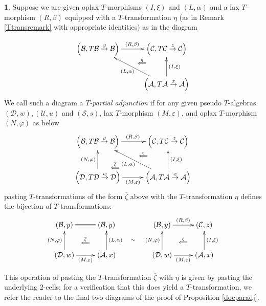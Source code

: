 \documentclass[a4paper,oneside,english]{amsart}
\numberwithin{equation}{section}
\numberwithin{figure}{section}
\theoremstyle{plain}
\theoremstyle{definition}
\newtheorem{defn}[thm]{\protect\definitionname}
\theoremstyle{remark}
\theoremstyle{definition}
\theoremstyle{plain}
\theoremstyle{plain}
\theoremstyle{plain}
\providecommand{\definitionname}{Definition}
\begin{document}
\begin{defn}
Suppose we are given oplax $T$-morphisms $\left(I,\xi\right)$ and
$\left(L,\alpha\right)$ and a lax $T$-morphism $\left(R,\beta\right)$
equipped with a $T$-transformation $\eta$ (as in Remark \ref{Ttransremark}
with appropriate identities) as in the diagram

\[
\xymatrix@=1em{\left(\mathcal{B},T\mathcal{B}\overset{y}{\rightarrow}\mathcal{B}\right)\ar[rr]^{\left(R,\beta\right)} &  & \left(\mathcal{C},T\mathcal{C}\overset{z}{\rightarrow}\mathcal{C}\right)\ar@{}[ld]|-{\stackrel{\eta}{\Longleftarrow}}\\
 & \;\\
 &  & \left(\mathcal{A},T\mathcal{A}\overset{x}{\rightarrow}\mathcal{A}\right)\ar[uu]_{\left(I,\xi\right)}\ar[uull]^{\left(L,\alpha\right)}
}
\]
We call such a diagram a \emph{$T$-partial adjunction }if for any
given pseudo $T$-algebras $\left(\mathcal{D},w\right),\left(\mathcal{U},u\right)$
and $\left(\mathcal{S},s\right)$, lax $T$-morphism $\left(M,{\varepsilon}\right)$,
and oplax $T$-morphism $\left(N,\varphi\right)$ as below
\[
\xymatrix@=1em{\left(\mathcal{B},T\mathcal{B}\overset{y}{\rightarrow}\mathcal{B}\right)\ar[rr]^{\left(R,\beta\right)} &  & \left(\mathcal{C},T\mathcal{C}\overset{z}{\rightarrow}\mathcal{C}\right)\ar@{}[ld]|-{\stackrel{\eta}{\Longleftarrow}}\\
 & \;\ar@{}[ld]|-{\stackrel{\overline{\zeta}}{\Longleftarrow}\quad\quad}\\
\left(\mathcal{D},T\mathcal{D}\overset{w}{\rightarrow}\mathcal{D}\right)\ar[rr]_{\left(M,{\varepsilon}\right)}\ar[uu]^{\left(N,\varphi\right)} &  & \left(\mathcal{A},T\mathcal{A}\overset{x}{\rightarrow}\mathcal{A}\right)\ar[uu]_{\left(I,\xi\right)}\ar[ulul]^{\left(L,\alpha\right)}
}
\]
pasting $T$-transformations of the form $\overline{\zeta}$ above
with the $T$-transformation $\eta$ defines the bijection of $T$-transformations:
\[
\xymatrix@=1em{\left(\mathcal{B},y\right)\ar@{=}[rr] &  & \left(\mathcal{B},y\right)\ar@{}[ldld]|-{\stackrel{\overline{\zeta}}{\Longleftarrow}} &  &  & \left(\mathcal{B},y\right)\ar[rr]^{\left(R,\beta\right)} &  & \left(\mathcal{C},z\right)\ar@{}[ldld]|-{\stackrel{\zeta}{\Longleftarrow}}\\
 &  &  & \ar@{}[r]|-{\sim} & \;\\
\left(\mathcal{D},w\right)\ar[rr]_{\left(M,{\varepsilon}\right)}\ar[uu]^{\left(N,\varphi\right)} &  & \left(\mathcal{A},x\right)\ar[uu]_{\left(L,\alpha\right)} &  &  & \left(\mathcal{D},w\right)\ar[rr]_{\left(M,{\varepsilon}\right)}\ar[uu]^{\left(N,\varphi\right)} &  & \left(\mathcal{A},x\right)\ar[uu]_{\left(I,\xi\right)}
}
\]

This operation of pasting the $T$-transformation $\overline{\zeta}$
with $\eta$ is given by pasting the underlying 2-cells; for a verification
that this does yield a $T$-transformation, we refer the reader to
the final two diagrams of the proof of Proposition \ref{docparadj}.\end{defn}
\end{document}
